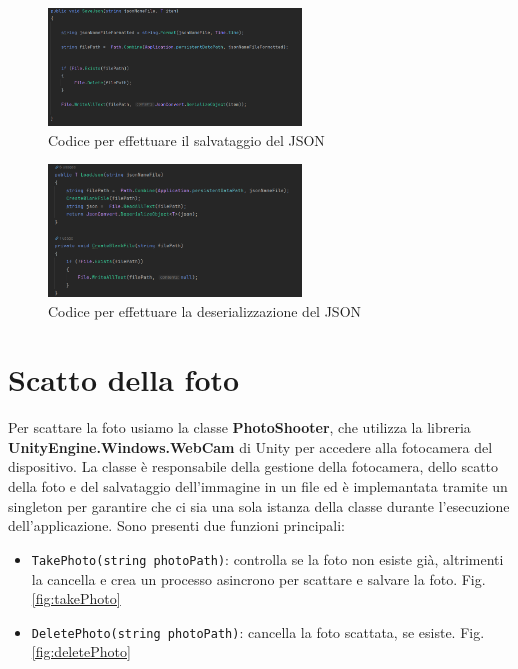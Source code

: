 \begin{figure}[H]
    \centering
    \includegraphics[width=0.6\textwidth,height=\textheight,keepaspectratio]{figures/chapter_1/saveJson_CODICE.png}
    \caption{Codice per effettuare il salvataggio del JSON}
    \label{fig:saveJson}
\end{figure}
\begin{figure}[H]
    \centering
    \includegraphics[width=0.6\textwidth,height=\textheight,keepaspectratio]{figures/chapter_1/LoadJson_CODICE.png}
    \caption{Codice per effettuare la deserializzazione del JSON}
    \label{fig:loadJson}
\end{figure}

\section{Scatto della foto}
Per scattare la foto usiamo la classe \textbf{PhotoShooter}, che utilizza la libreria \\ \textbf{UnityEngine.Windows.WebCam} di Unity per accedere alla fotocamera del dispositivo. La classe è responsabile della gestione della fotocamera, dello scatto della foto e del salvataggio dell'immagine in un file ed è implemantata tramite un singleton per garantire che ci sia una sola istanza della classe durante l'esecuzione dell'applicazione.
Sono presenti due funzioni principali:
\begin{itemize}
    \item \texttt{TakePhoto(string photoPath)}: controlla se la foto non esiste già, altrimenti la cancella e crea un processo asincrono per scattare e salvare la foto. Fig.\ref{fig:takePhoto}
    \item \texttt{DeletePhoto(string photoPath)}: cancella la foto scattata, se esiste. Fig.\ref{fig:deletePhoto}
\end{itemize}

